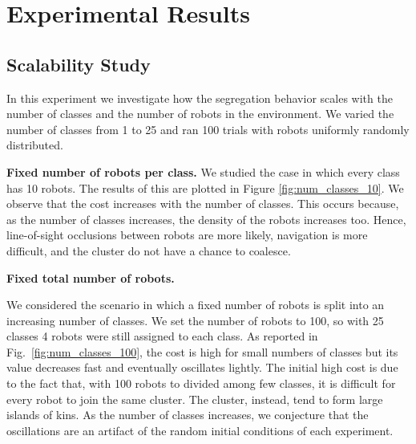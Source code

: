 \documentclass[conference]{IEEEtran}
\newcommand{\myparagraph}[1]{\textbf{#1.}}
\begin{document}

\section{Experimental Results}



\subsection{Scalability Study} \label{section:scalability}

In this experiment we investigate how the segregation behavior scales with the
number of classes and the number of robots in the environment. We varied the
number of classes from 1 to 25 and ran 100 trials with robots uniformly randomly
distributed.

\myparagraph{Fixed number of robots per class}
We studied the case in which every class has 10 robots. The results of this are
plotted in Figure \ref{fig:num_classes_10}. We observe that the cost increases
with the number of classes. This occurs because, as the number of classes
increases, the density of the robots increases too. Hence, line-of-sight
occlusions between robots are more likely, navigation is more difficult, and the
cluster do not have a chance to coalesce.

\myparagraph{Fixed total number of robots}

We considered the scenario in which a fixed number of robots is split into an
increasing number of classes. We set the number of robots to 100, so with 25
classes 4 robots were still assigned to each class. As reported in
Fig.~\ref{fig:num_classes_100}, the cost is high for small numbers of classes
but its value decreases fast and eventually oscillates lightly. The initial high
cost is due to the fact that, with 100 robots to divided among few classes, it
is difficult for every robot to join the same cluster. The cluster, instead,
tend to form large islands of kins. As the number of classes increases, we
conjecture that the oscillations are an artifact of the random initial
conditions of each experiment.
\end{document}
